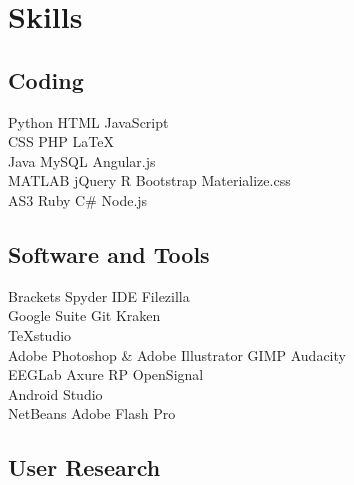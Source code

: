 \documentclass[a4paper]{deedy-resume} %
\begin{document}
\begin{minipage}[t]{0.28\textwidth} %

\section{Skills}

\subsection{Coding}

Python \textbullet{} HTML \textbullet{} JavaScript\\
CSS \textbullet{} PHP  \textbullet LaTeX\\ 
Java \textbullet{} MySQL  \textbullet{} Angular.js\\ MATLAB \textbullet{} jQuery  \textbullet{} R \textbullet{} Bootstrap \textbullet{} Materialize.css\\
AS3 \textbullet{} Ruby \textbullet{} C\#  \textbullet{} Node.js\\
\sectionspace %

\subsection{Software and Tools}

Brackets \textbullet{} Spyder IDE \textbullet{} Filezilla \\ Google Suite \textbullet{} Git Kraken\\  TeXstudio\\
Adobe Photoshop \& Adobe Illustrator \textbullet{} GIMP \textbullet{} Audacity 	\\  EEGLab \textbullet{} 
Axure RP \textbullet{} OpenSignal \\  Android Studio\\
NetBeans \textbullet{} Adobe Flash Pro\\

\sectionspace %
\subsection{User Research}


\end{minipage}
\end{document}
